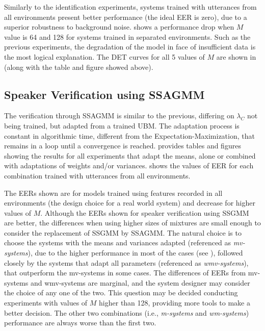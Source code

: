 Similarly to the identification experiments, systems trained with utterances from all environments present better performance (the ideal EER is zero), due to a superior robustness to background noise.  shows a performance drop when $M$ value is 64 and 128 for systems trained in separated environments. Such as the previous experiments, the degradation of the model in face of insufficient data is the most logical explanation. The DET curves for all 5 values of $M$ are shown in  (along with the table and figure showed above).

\subsection{Speaker Verification using SSAGMM}

The verification through SSAGMM is similar to the previous, differing on $\lambda_C$ not being trained, but adapted from a trained UBM. The adaptation process is constant in algorithmic time, different from the Expectation-Maximization, that remains in a loop until a convergence is reached.  provides tables and figures showing the results for all experiments that adapt the means, alone or combined with adaptations of weights and/or variances.  shows the values of EER for each combination trained with utterances from all environments.



The EERs shown are for models trained using features recorded in all environments (the design choice for a real world system) and decrease for higher values of $M$. Although the EERs shown for speaker verification using SSGMM are better, the differences when using higher sizes of mixtures are small enough to consider the replacement of SSGMM by SSAGMM. The natural choice is to choose the systems with the means and variances adapted (referenced as \emph{mv-systems}), due to the higher performance in most of the cases (see ), followed closely by the systems that adapt all parameters (referenced as \emph{wmv-systems}), that outperform the mv-systems in some cases. The differences of EERs from mv-systems and wmv-systems are marginal, and the system designer may consider the choice of any one of the two. This question may be decided conducting experiments with values of $M$ higher than 128, providing more tools to make a better decision. The other two combinations (i.e., \emph{m-systems} and \emph{wm-systems}) performance are always worse than the first two.